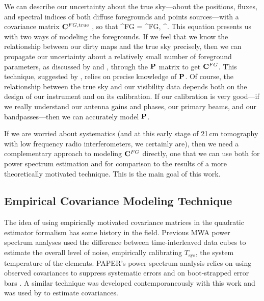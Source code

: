 We can describe our uncertainty about the true sky---about the positions, fluxes, and spectral indices of both diffuse foregrounds and points sources---with a covariance matrix $\mathbf{C}^{FG,\text{true}}$ \citep{LT11,DillonFast}, so that
\beq
\CC^{FG} = \PSF \CC^{FG,} \PSF^\trans.
\eeq
This equation presents us with two ways of modeling the foregrounds. If we feel that we know the relationship between our dirty maps and the true sky precisely, then we can propagate our uncertainty about a relatively small number of foreground parameters, as discussed by \citet{LT11} and \citet{DillonFast}, through the $\mathbf{P}$ matrix to get $\mathbf{C}^{FG}$. This technique, suggested by \citet{dillonmapmaking}, relies on precise knowledge of $\mathbf{P}$. Of course, the relationship between the true sky and our visibility data depends both on the design of our instrument and on its calibration. If our calibration is very good---if we really understand our antenna gains and phases, our primary beams, and our bandpasses---then we can accurately model $\mathbf{P}$.

If we are worried about systematics (and at this early stage of 21\,cm tomography with low frequency radio interferometers, we certainly are), then we need a complementary approach to modeling $\mathbf{C}^{FG}$ directly, one that we can use both for power spectrum estimation and for comparison to the results of a more theoretically motivated technique. This is the main goal of this work.


\subsection{Empirical Covariance Modeling Technique} \label{sec:empirical}

The idea of using empirically motivated covariance matrices in the quadratic estimator formalism has some history in the field. Previous MWA power spectrum analyses \citep{X13} used the difference between time-interleaved data cubes to estimate the overall level of noise, empirically calibrating $T_\text{sys}$, the system temperature of the elements. PAPER's power spectrum analysis relies on using observed covariances to suppress systematic errors \citep{parsons14} and on boot-strapped error bars \citep{parsons14,DannyMultiRedshift}. A similar technique was developed contemporaneously with this work and was used by \citet{ali15} to estimate covariances.

